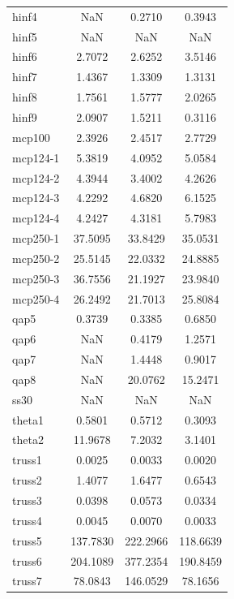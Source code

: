 \begin{longtable}{lccc}
hinf4    &      NaN &   0.2710 &   0.3943 \\
hinf5    &      NaN &      NaN &      NaN \\
hinf6    &   2.7072 &   2.6252 &   3.5146 \\
hinf7    &   1.4367 &   1.3309 &   1.3131 \\
hinf8    &   1.7561 &   1.5777 &   2.0265 \\
hinf9    &   2.0907 &   1.5211 &   0.3116 \\
mcp100   &   2.3926 &   2.4517 &   2.7729 \\
mcp124-1 &   5.3819 &   4.0952 &   5.0584 \\
mcp124-2 &   4.3944 &   3.4002 &   4.2626 \\
mcp124-3 &   4.2292 &   4.6820 &   6.1525 \\
mcp124-4 &   4.2427 &   4.3181 &   5.7983 \\
mcp250-1 &  37.5095 &  33.8429 &  35.0531 \\
mcp250-2 &  25.5145 &  22.0332 &  24.8885 \\
mcp250-3 &  36.7556 &  21.1927 &  23.9840 \\
mcp250-4 &  26.2492 &  21.7013 &  25.8084 \\
qap5     &   0.3739 &   0.3385 &   0.6850 \\
qap6     &      NaN &   0.4179 &   1.2571 \\
qap7     &      NaN &   1.4448 &   0.9017 \\
qap8     &      NaN &  20.0762 &  15.2471 \\
ss30     &      NaN &      NaN &      NaN \\
theta1   &   0.5801 &   0.5712 &   0.3093 \\
theta2   &  11.9678 &   7.2032 &   3.1401 \\
truss1   &   0.0025 &   0.0033 &   0.0020 \\
truss2   &   1.4077 &   1.6477 &   0.6543 \\
truss3   &   0.0398 &   0.0573 &   0.0334 \\
truss4   &   0.0045 &   0.0070 &   0.0033 \\
truss5   & 137.7830 & 222.2966 & 118.6639 \\
truss6   & 204.1089 & 377.2354 & 190.8459 \\
truss7   &  78.0843 & 146.0529 &  78.1656 \\
\end{longtable}
